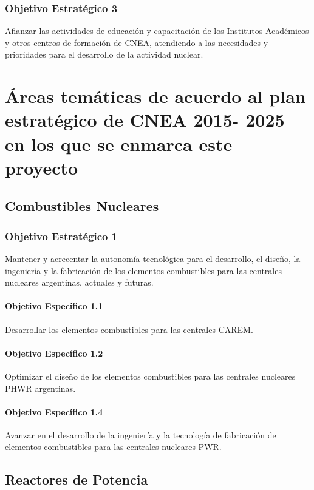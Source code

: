 \subsubsection{Objetivo Estratégico 3}
Afianzar las actividades de educación y
capacitación de los Institutos Académicos y otros centros de formación de
CNEA, atendiendo a las necesidades y prioridades para el desarrollo de la
actividad nuclear.

\section{
Áreas temáticas de acuerdo al plan estratégico de CNEA 2015-
2025 en los que se enmarca este proyecto
}

\subsection{Combustibles Nucleares}

\subsubsection{Objetivo Estratégico 1}

Mantener y acrecentar la autonomía tecnológica
para el desarrollo, el diseño, la ingeniería y la fabricación de los elementos
combustibles para las centrales nucleares argentinas, actuales y futuras.

\paragraph{Objetivo Específico 1.1}
Desarrollar los elementos combustibles para las centrales CAREM.
%
\paragraph{Objetivo Específico 1.2} Optimizar el diseño de los elementos combustibles para las
centrales nucleares PHWR argentinas.

\paragraph{Objetivo Específico 1.4}

Avanzar en el desarrollo de la ingeniería y la tecnología de
fabricación de elementos combustibles para las centrales nucleares PWR.


\subsection{Reactores de Potencia}

